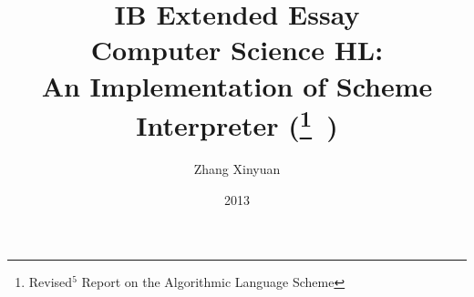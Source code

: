 \documentclass[a4paper]{article}
\title{
IB Extended Essay\\
Computer Science HL:\\
An Implementation of Scheme Interpreter
(\RFIVERS$\!\!$\footnote{Revised$^5$ Report on the Algorithmic Language Scheme}~)
}
\author{Zhang Xinyuan}
\date{2013}
\begin{document}


\maketitle

\newpage


\tableofcontents

% 







\begin{comment}
Hello, this is a test.

And test for math formula:

$$\int_0^1{f(t)e^{-2i\pi{}kt}}$$

And inlines: $\phi = \frac{\sqrt{5}\pm 1}{2}$

Test foot\footnote{this is a footnote.}note.

\underline{underline} is good, either \textit{itatlic} and
\emph{emphasis}.


try \verb verb texts

done.
\end{comment}
\end{document}
